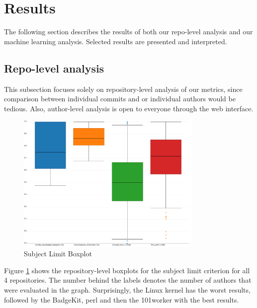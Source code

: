 \section{Results}
\label{sec:results}

The following section describes the results of both our repo-level analysis and our machine learning analysis. Selected results are presented and interpreted.


\subsection{Repo-level analysis}
\label{sec:results1}


This subsection focuses solely on repository-level analysis of our metrics, since comparison between individual commits and or individual authors would be tedious. Also, author-level analysis is open to everyone through the web interface.

\begin{figure}[p]
    \centering
    \includegraphics[width=0.8\textwidth]{img/subject_limit.pdf}
    \caption{Subject Limit Boxplot}
    \label{fig:bp_subject_limit}
\end{figure}

Figure \ref{fig:bp_subject_limit} shows the repository-level boxplots for the subject limit criterion for all 4 repositories. The number behind the labels denotes the number of authors that were evaluated in the graph. Surprisingly, the Linux kernel has the worst results, followed by the BadgeKit, perl and then the 101worker with the best results.

